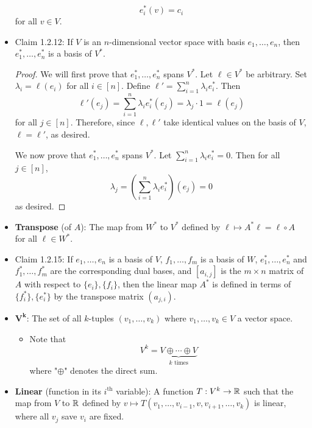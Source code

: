 \documentclass[../notes.tex]{subfiles}
\begin{document}
\begin{itemize}
    \begin{equation*}
        e_i^*(v) = c_i
    \end{equation*}
    for all $v\in V$.
    \item Claim 1.2.12: If $V$ is an $n$-dimensional vector space with basis $e_1,\dots,e_n$, then $e_1^*,\dots,e_n^*$ is a basis of $V^*$.
    \begin{proof}
        We will first prove that $e_1^*,\dots,e_n^*$ spans $V^*$. Let $\ell\in V^*$ be arbitrary. Set $\lambda_i=\ell(e_i)$ for all $i\in[n]$. Define $\ell'=\sum_{i=1}^n\lambda_ie_i^*$. Then
        \begin{equation*}
            \ell'(e_j) = \sum_{i=1}^n\lambda_ie_i^*(e_j)
            = \lambda_j\cdot 1
            = \ell(e_j)
        \end{equation*}
        for all $j\in[n]$. Therefore, since $\ell,\ell'$ take identical values on the basis of $V$, $\ell=\ell'$, as desired.\par
        We now prove that $e_1^*,\dots,e_n^*$ spans $V^*$. Let $\sum_{i=1}^n\lambda_ie_i^*=0$. Then for all $j\in[n]$,
        \begin{equation*}
            \lambda_j = \left( \sum_{i=1}^n\lambda_ie_i^* \right)(e_j)
            = 0
        \end{equation*}
        as desired.
    \end{proof}
    \item \textbf{Transpose} (of $A$): The map from $W^*$ to $V^*$ defined by $\ell\mapsto A^*\ell=\ell\circ A$ for all $\ell\in W^*$.
    \item Claim 1.2.15: If $e_1,\dots,e_n$ is a basis of $V$, $f_1,\dots,f_m$ is a basis of $W$, $e_1^*,\dots,e_n^*$ and $f_1^*,\dots,f_m^*$ are the corresponding dual bases, and $[a_{i,j}]$ is the $m\times n$ matrix of $A$ with respect to $\{e_i\},\{f_i\}$, then the linear map $A^*$ is defined in terms of $\{f_i^*\},\{e_i^*\}$ by the transpose matrix $(a_{j,i})$.
    \item {}$\bm{V^k}$: The set of all $k$-tuples $(v_1,\dots,v_k)$ where $v_1,\dots,v_k\in V$ a vector space.
    \begin{itemize}
        \item Note that
        \begin{equation*}
            V^k = \underbrace{V\oplus\cdots\oplus V}_{k\text{ times}}
        \end{equation*}
        where "$\oplus$" denotes the direct sum.
    \end{itemize}
    \item \textbf{Linear} (function in its $i^\text{th}$ variable): A function $T:V^k\to\mathbb{R}$ such that the map from $V$ to $\mathbb{R}$ defined by $v\mapsto T(v_1,\dots,v_{i-1},v,v_{i+1},\dots,v_k)$ is linear, where all $v_j$ save $v_i$ are fixed.

\end{itemize}
\end{document}
